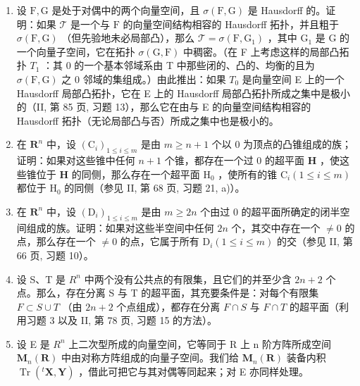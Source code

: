 \exercisegroup

\begin{enumerate}
\def\labelenumi{\arabic{enumi})}
\item
  设 \(\mathrm{F}, \mathrm{G}\) 是处于对偶中的两个向量空间，且 \(\sigma(\mathrm{F}, \mathrm{G})\) 是 Hausdorff 的。证明：如果 \(\mathcal{T}\) 是一个与 \(\mathrm{F}\) 的向量空间结构相容的 Hausdorff 拓扑，并且粗于 \(\sigma(\mathrm{F}, \mathrm{G})\) （但先验地未必局部凸），那么 \(\mathcal{T} = \sigma(\mathrm{F}, \mathrm{G}_1)\) ，其中 \(\mathrm{G}_1\) 是 G 的一个向量子空间，它在拓扑 \(\sigma(\mathrm{G},\mathrm{F})\) 中稠密。（在 F 上考虑这样的局部凸拓扑 \(T_{1}\) ：其 0 的一个基本邻域系由 T 中那些闭的、凸的、均衡的且为 \(\sigma(\mathrm{F},\mathrm{G})\) 之 0 邻域的集组成。）由此推出：如果 \(T_{0}\) 是向量空间 E 上的一个 Hausdorff 局部凸拓扑，它在 E 上的 Hausdorff 局部凸拓扑所成之集中是极小的（II, 第 85 页, 习题 13），那么它在由与 E 的向量空间结构相容的 Hausdorff 拓扑（无论局部凸与否）所成之集中也是极小的。
\item
  在 \(\mathbf{R}^n\) 中，设 \((\mathrm{C}_i)_{1\leqslant i\leqslant m}\) 是由 \(m\geqslant n + 1\) 个以 0 为顶点的凸锥组成的族；证明：如果对这些锥中任何 \(n + 1\) 个锥，都存在一个过 0 的超平面 \(\mathbf{H}\) ，使这些锥位于 \(\mathbf{H}\) 的同侧，那么存在一个超平面 \(\mathrm{H}_0\) ，使所有的锥 \(\mathrm{C}_i(1\leqslant i\leqslant m)\) 都位于 \(\mathrm{H}_0\) 的同侧（参见 II, 第 68 页, 习题 21, a)）。
\item
  在 \(\mathbf{R}^n\) 中，设 \((\mathrm{D}_i)_{1\leqslant i\leqslant m}\) 是由 \(m\geqslant 2n\) 个由过 0 的超平面所确定的闭半空间组成的族。证明：如果对这些半空间中任何 \(2n\) 个，其交中存在一个 \(\neq 0\) 的点，那么存在一个 \(\neq 0\) 的点，它属于所有 \(\mathrm{D}_i(1\leqslant i\leqslant m)\) 的交（参见 II, 第 66 页, 习题 10）。
\item
  设 S、T 是 \(R^{n}\) 中两个没有公共点的有限集，且它们的并至少含 \(2n + 2\) 个点。那么，存在分离 S 与 T 的超平面，其充要条件是：对每个有限集 \(F \subset S \cup T\) （由 \(2n + 2\) 个点组成），都存在分离 \(F \cap S\) 与 \(F \cap T\) 的超平面（利用习题 3 以及 II, 第 78 页, 习题 15 的方法）。
\item
  设 E 是 \(R^{n}\) 上二次型所成的向量空间，它等同于 R 上 n 阶方阵所成空间 \(\mathbf{M}_{n}(\mathbf{R})\) 中由对称方阵组成的向量子空间。我们给 \(\mathbf{M}_{n}(\mathbf{R})\) 装备内积 \(\operatorname{Tr}(^{t}\mathbf{X},\mathbf{Y})\) ，借此可把它与其对偶等同起来；对 E 亦同样处理。
\end{enumerate}

